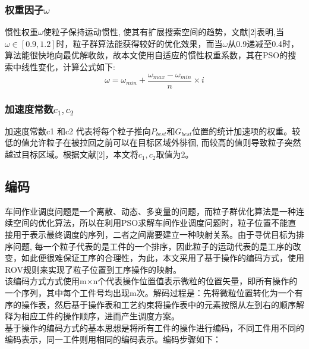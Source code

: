 \documentclass[UTF8]{ctexart}
\begin{document}
\begin{multicols}{2}
\subsubsection{权重因子$\omega$}
惯性权重$\omega$使粒子保持运动惯性, 使其有扩展搜索空间的趋势，文献[2]表明,当$\omega \in [0.9,1.2]$时，粒子群算法能获得较好的优化效果，而当$\omega$从0.9递减至0.4时，算法能很快地向最优解收敛，故本文使用自适应的惯性权重系数，其在PSO的搜索中线性变化，计算公式如下:
	\[\omega = \omega_{min} +\frac{\omega_{max} - \omega_{min}}{n}  \times i \]
\subsubsection{加速度常数$c_1,c_2$}
加速度常数c1 和c2 代表将每个粒子推向$P_{best}$和$G_{best}$位置的统计加速项的权重。较低的值允许粒子在被拉回之前可以在目标区域外徘徊, 而较高的值则导致粒子突然越过目标区域。根据文献[2]，本文将$c_1,c_2$取值为2。
\subsection{编码}车间作业调度问题是一个离散、动态、多变量的问题，而粒子群优化算法是一种连续空间的优化算法，所以在利用PSO求解车间作业调度问题时，粒子位置不能直接用于表示最终调度的序列，二者之间需要建立一种映射关系。由于寻优目标为排序问题, 每一个粒子代表的是工件的一个排序，因此粒子的运动代表的是工序的改变，如此便很难保证工序的合理性，为此，本文采用了基于操作的编码方式，使用ROV规则来实现了粒子位置到工序操作的映射。\\
\indent 该编码方式方式使用m$\times$n个代表操作位置值表示微粒的位置矢量，即所有操作的一个序列，其中每个工件号均出现m次。解码过程是：先将微粒位置转化为一个有序的操作表，然后基于操作表和工艺约束将操作表中的元素按照从左到右的顺序解释为相应工件的操作顺序，进而产生调度方案。\\
\indent 基于操作的编码方式的基本思想是将所有工件的操作进行编码，不同工件用不同的编码表示，同一工件则用相同的编码表示。编码步骤如下：

\end{multicols}
\end{document}
